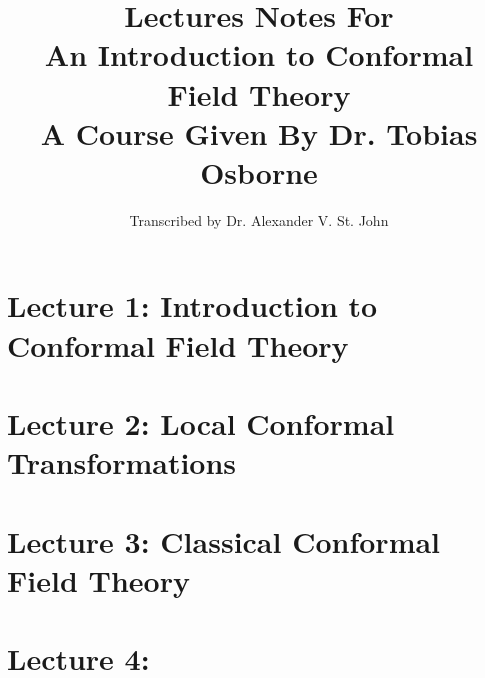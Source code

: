 \documentclass[10pt]{article}
\title{Lectures Notes For \\ An Introduction to Conformal Field Theory \\ A Course Given By Dr. Tobias Osborne}
\author{Transcribed by Dr. Alexander V. St. John}
\begin{document}
\maketitle

\clearpage

\section*{Lecture 1: Introduction to Conformal Field Theory}
\label{sec: lec1}



\clearpage

\section*{Lecture 2: Local Conformal Transformations}
\label{sec: lec2}



\clearpage

\section*{Lecture 3: Classical Conformal Field Theory}
\label{sec: lec3}



\clearpage

\section*{Lecture 4: }
\label{sec: lec4}

%

\end{document}
